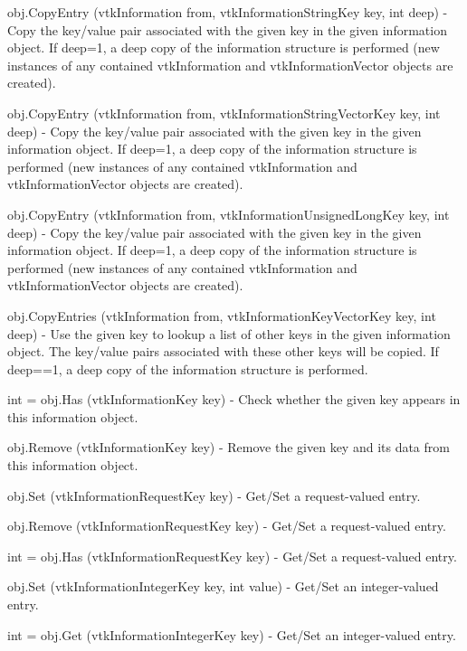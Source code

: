 \begin{DoxyItemize}
\item {\ttfamily obj.\-Copy\-Entry (vtk\-Information from, vtk\-Information\-String\-Key key, int deep)} -\/ Copy the key/value pair associated with the given key in the given information object. If deep=1, a deep copy of the information structure is performed (new instances of any contained vtk\-Information and vtk\-Information\-Vector objects are created).  
\item {\ttfamily obj.\-Copy\-Entry (vtk\-Information from, vtk\-Information\-String\-Vector\-Key key, int deep)} -\/ Copy the key/value pair associated with the given key in the given information object. If deep=1, a deep copy of the information structure is performed (new instances of any contained vtk\-Information and vtk\-Information\-Vector objects are created).  
\item {\ttfamily obj.\-Copy\-Entry (vtk\-Information from, vtk\-Information\-Unsigned\-Long\-Key key, int deep)} -\/ Copy the key/value pair associated with the given key in the given information object. If deep=1, a deep copy of the information structure is performed (new instances of any contained vtk\-Information and vtk\-Information\-Vector objects are created).  
\item {\ttfamily obj.\-Copy\-Entries (vtk\-Information from, vtk\-Information\-Key\-Vector\-Key key, int deep)} -\/ Use the given key to lookup a list of other keys in the given information object. The key/value pairs associated with these other keys will be copied. If deep==1, a deep copy of the information structure is performed.  
\item {\ttfamily int = obj.\-Has (vtk\-Information\-Key key)} -\/ Check whether the given key appears in this information object.  
\item {\ttfamily obj.\-Remove (vtk\-Information\-Key key)} -\/ Remove the given key and its data from this information object.  
\item {\ttfamily obj.\-Set (vtk\-Information\-Request\-Key key)} -\/ Get/\-Set a request-\/valued entry.  
\item {\ttfamily obj.\-Remove (vtk\-Information\-Request\-Key key)} -\/ Get/\-Set a request-\/valued entry.  
\item {\ttfamily int = obj.\-Has (vtk\-Information\-Request\-Key key)} -\/ Get/\-Set a request-\/valued entry.  
\item {\ttfamily obj.\-Set (vtk\-Information\-Integer\-Key key, int value)} -\/ Get/\-Set an integer-\/valued entry.  
\item {\ttfamily int = obj.\-Get (vtk\-Information\-Integer\-Key key)} -\/ Get/\-Set an integer-\/valued entry.  

\end{DoxyItemize}
